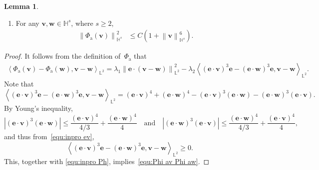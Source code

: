 \documentclass[11pt, reqno]{amsart}
\theoremstyle{definition}
\newtheorem{lemma}[theorem]{Lemma}
\numberwithin{equation}{section}
\newcommand{\bff}{\boldsymbol}
\newcommand{\bb}{\mathbb}
\newcommand{\norm}[2]{\left\|{#1}\right\|_{#2}}
\newcommand{\inpro}[2]{\left\langle#1,#2\right\rangle}
\begin{document}
\begin{lemma}
\begin{enumerate}
\begin{align}
    \nonumber \\
    &\quad
    +
    C \left(\norm{\bff{v}}{\bb{H}^1}^2+ \norm{\bff{w}}{\bb{H}^1}^2 \right) \left(\norm{\bff{v}}{\bb{H}^3}^2+ \norm{\bff{w}}{\bb{H}^3}^2 \right) \norm{\bff{v}-\bff{w}}{\bb{H}^1}^2.
\end{align}
\item
For any $\bff{v},\bff{w} \in \bb{H}^s$, where $s\geq 2$,
\begin{align}
\label{equ:Phi a Hs}
    \norm{\Phi_{\mathrm{a}}(\bff{v})}{\bb{H}^s}^2
    &\leq
    C\left(1+\norm{\bff{v}}{\bb{H}^s}^6\right).
\end{align}
\end{enumerate}
\end{lemma}

\begin{proof}
It follows from the definition of~$\Phi_{\mathrm{a}}$ that
\begin{align}\label{equ:inpro Ph}
    \inpro{\Phi_{\mathrm{a}}(\bff{v})-\Phi_{\mathrm{a}}(\bff{w})}{\bff{v}-\bff{w}}_{\bb{L}^2}
    =
    \lambda_1 \norm{\bff{e}\cdot (\bff{v}-\bff{w})}{\bb{L}^2}^2
    -
    \lambda_2 \inpro{(\bff{e}\cdot \bff{v})^3 \bff{e}-(\bff{e}\cdot \bff{w})^3 \bff{e}}{\bff{v}-\bff{w}}_{\bb{L}^2}.
\end{align}
Note that
\begin{equation}\label{equ:inpro ev}
    \inpro{(\bff{e}\cdot \bff{v})^3 \bff{e}-(\bff{e}\cdot \bff{w})^3 \bff{e}}{\bff{v}-\bff{w}}_{\bb{L}^2}
    =
    (\bff{e}\cdot \bff{v})^4
    +
    (\bff{e}\cdot \bff{w})^4
    -
    (\bff{e}\cdot \bff{v})^3 (\bff{e}\cdot \bff{w})
    -
    (\bff{e}\cdot \bff{w})^3 (\bff{e}\cdot \bff{v}).
\end{equation}
By Young's inequality,
\[
    |(\bff{e}\cdot \bff{v})^3 (\bff{e}\cdot \bff{w})|
    \leq
    \frac{(\bff{e}\cdot \bff{v})^4}{4/3}
    +
    \frac{(\bff{e}\cdot \bff{w})^4}{4}
    \quad \text{and} \quad
    |(\bff{e}\cdot \bff{w})^3 (\bff{e}\cdot \bff{v})|
    \leq
    \frac{(\bff{e}\cdot \bff{w})^4}{4/3}
    +
    \frac{(\bff{e}\cdot \bff{v})^4}{4},
\]
and thus from~\eqref{equ:inpro ev},
\[
    \inpro{(\bff{e}\cdot \bff{v})^3 \bff{e}-(\bff{e}\cdot \bff{w})^3 \bff{e}}{\bff{v}-\bff{w}}_{\bb{L}^2} \geq 0.
\]
This, together with \eqref{equ:inpro Ph}, implies~\eqref{equ:Phi av Phi aw}.


\end{proof}
\end{document}
